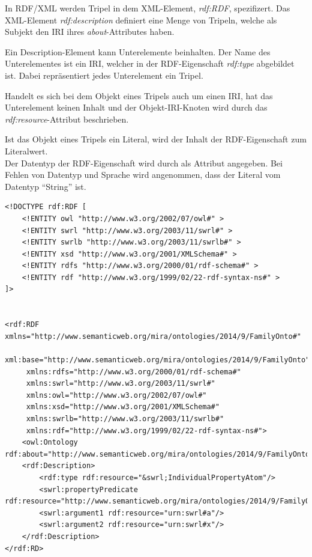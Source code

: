 In RDF/XML werden Tripel in dem XML-Element, \textit{rdf:RDF}, spezifizert. Das XML-Element \textit{rdf:description} definiert eine Menge von Tripeln, welche als Subjekt den IRI ihres \textit{about}-Attributes haben.

Ein Description-Element kann Unterelemente beinhalten. Der Name des Unterelementes ist ein IRI, welcher in der RDF-Eigenschaft \textit{rdf:type} abgebildet ist. Dabei repräsentiert jedes Unterelement ein Tripel.

Handelt es sich bei dem Objekt eines Tripels auch um einen IRI, hat das Unterelement keinen Inhalt und der Objekt-IRI-Knoten wird durch das \textit{rdf:resource}-Attribut beschrieben.

Ist das Objekt eines Tripels ein Literal, wird der Inhalt der RDF-Eigenschaft zum Literalwert.\\
Der Datentyp der RDF-Eigenschaft wird durch als Attribut angegeben. Bei Fehlen von Datentyp und Sprache wird angenommen, dass der Literal vom Datentyp ``String'' ist.

\begin{lstlisting}[caption={Beispiel RDF Elemente\protect\footnotemark}]
<!DOCTYPE rdf:RDF [
    <!ENTITY owl "http://www.w3.org/2002/07/owl#" >
    <!ENTITY swrl "http://www.w3.org/2003/11/swrl#" >
    <!ENTITY swrlb "http://www.w3.org/2003/11/swrlb#" >
    <!ENTITY xsd "http://www.w3.org/2001/XMLSchema#" >
    <!ENTITY rdfs "http://www.w3.org/2000/01/rdf-schema#" >
    <!ENTITY rdf "http://www.w3.org/1999/02/22-rdf-syntax-ns#" >
]>


<rdf:RDF xmlns="http://www.semanticweb.org/mira/ontologies/2014/9/FamilyOnto#"
     xml:base="http://www.semanticweb.org/mira/ontologies/2014/9/FamilyOnto"
     xmlns:rdfs="http://www.w3.org/2000/01/rdf-schema#"
     xmlns:swrl="http://www.w3.org/2003/11/swrl#"
     xmlns:owl="http://www.w3.org/2002/07/owl#"
     xmlns:xsd="http://www.w3.org/2001/XMLSchema#"
     xmlns:swrlb="http://www.w3.org/2003/11/swrlb#"
     xmlns:rdf="http://www.w3.org/1999/02/22-rdf-syntax-ns#">
    <owl:Ontology rdf:about="http://www.semanticweb.org/mira/ontologies/2014/9/FamilyOnto"/>
    <rdf:Description>
        <rdf:type rdf:resource="&swrl;IndividualPropertyAtom"/>
        <swrl:propertyPredicate rdf:resource="http://www.semanticweb.org/mira/ontologies/2014/9/FamilyOnto#isAncestor"/>
        <swrl:argument1 rdf:resource="urn:swrl#a"/>
        <swrl:argument2 rdf:resource="urn:swrl#x"/>
    </rdf:Description>
</rdf:RD>
\end{lstlisting}
